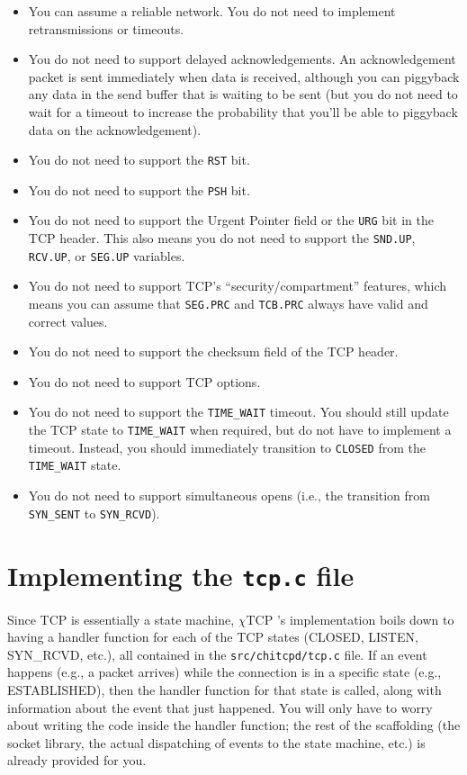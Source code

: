 \documentclass[10pt]{article}
\newcommand{\chitcp}{$\chi$\textsf{TCP} }
\begin{document}
\begin{itemize}
 \item You can assume a reliable network. You do not need to implement retransmissions or timeouts.
 \item You do not need to support delayed acknowledgements. An acknowledgement packet is sent immediately when data is received, although you can piggyback any data in the send buffer that is waiting to be sent (but you do not need to wait for a timeout to increase the probability that you'll be able to piggyback data on the acknowledgement).
 \item You do not need to support the \texttt{RST} bit.
 \item You do not need to support the \texttt{PSH} bit.
 \item You do not need to support the Urgent Pointer field or the \texttt{URG} bit in the TCP header. This also means you do not need to support the \texttt{SND.UP}, \texttt{RCV.UP}, or \texttt{SEG.UP} variables.
 \item You do not need to support TCP's ``security/compartment'' features, which means you can assume that \texttt{SEG.PRC} and \texttt{TCB.PRC} always have valid and correct values.
 \item You do not need to support the checksum field of the TCP header.
 \item You do not need to support TCP options.
 \item You do not need to support the \texttt{TIME\_WAIT} timeout. You should still update the TCP state to \texttt{TIME\_WAIT} when required, but do not have to implement a timeout. Instead, you should immediately transition to \texttt{CLOSED} from the \texttt{TIME\_WAIT} state.
 \item You do not need to support simultaneous opens (i.e., the transition from \texttt{SYN\_SENT} to \texttt{SYN\_RCVD}).
\end{itemize}



\section{Implementing the \texttt{tcp.c} file}
\label{sec:tcpc}

Since TCP is essentially a state machine, \chitcp's implementation boils down to having a handler function for each of the TCP states (CLOSED, LISTEN, SYN\_RCVD, etc.), all contained in the \texttt{src/chitcpd/tcp.c} file. If an event happens (e.g., a packet arrives) while the connection is in a specific state (e.g., ESTABLISHED), then the handler function for that state is called, along with information about the event that just happened. You will only have to worry about writing the code inside the handler function; the rest of the scaffolding (the socket library, the actual dispatching of events to the state machine, etc.) is already provided for you.
 
\end{document}

